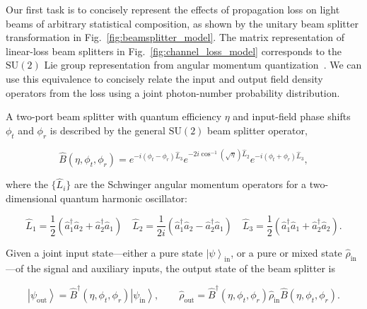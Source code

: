 \documentclass[aps,twocolumn,secnumarabic,amsmath,amssymb,pra,groupedaddress,
showpacs, showkeys]{revtex4-1}
\newcommand{\ket}[1]{\left|#1\right\rangle}
\newcommand{\pna}[1]{\left(#1\right)}
\newcommand{\eqn}[1]{
\begin{equation}
	#1
\end{equation}
}
\begin{document}
Our first task is to concisely represent the effects of propagation loss on
light beams of arbitrary statistical composition, as shown by the unitary beam
splitter transformation in Fig.~\ref{fig:beamsplitter_model}.  The matrix
representation of linear-loss beam splitters in
Fig.~\ref{fig:channel_loss_model} corresponds to the $\textrm{SU}\pna{2}$ Lie
group representation from angular momentum
quantization~\cite{PhysRevA.40.1371}. We can use this equivalence to concisely
relate the input and output field density operators from the loss using a joint
photon-number probability distribution.

A two-port beam splitter with quantum efficiency $\eta$ and input-field phase
shifts $\phi_t$ and $\phi_r$ is described by the general $\textrm{SU}\pna{2}$
beam splitter operator,
\eqn{
\hat{B}\pna{\eta,\phi_t,\phi_r}=e^{-i\pna{\phi_t-\phi_r}\hat{L}_3}e^{-2i\cos^{-1}\pna{\sqrt{\eta}}\hat{L}_2}e^{-i\pna{\phi_t+\phi_r}\hat{L}_3},\label{eq:bs_operator_def}
}
where the $\{\hat{L}_i\}$ are the Schwinger angular momentum operators for a
two-dimensional quantum harmonic oscillator:
\eqn{
\hat{L}_1 = \frac{1}{2}\pna{\hat{a}_1^{\dagger}\hat{a}_2+\hat{a}^{\dagger}_2\hat{a}_1} \quad 
\hat{L}_2 = \frac{1}{2i}\pna{\hat{a}_1^{\dagger}\hat{a}_2-\hat{a}^{\dagger}_2\hat{a}_1}\quad 
\hat{L}_3 = \frac{1}{2}\pna{\hat{a}_1^{\dagger}\hat{a}_1+\hat{a}^{\dagger}_2\hat{a}_2}.
}
Given a joint input state---either a pure state $\ket{\psi}_{\textrm{in}}$, or
a pure or mixed state $\hat{\rho}_{\textrm{in}}$---of the signal and auxiliary
inputs, the output state of the beam splitter is
\eqn{
\ket{\psi_{\textrm{out}}}=\hat{B}^{\dagger}\pna{\eta,\phi_t,\phi_r}\ket{\psi_{\textrm{in}}}, \qquad 
\hat{\rho}_{\textrm{out}}=\hat{B}^{\dagger}\pna{\eta,\phi_t,\phi_r}\hat{\rho}_{\textrm{in}}\hat{B}\pna{\eta,\phi_t,\phi_r}.\label{eq:beamsplitter_trans}}
\end{document}
